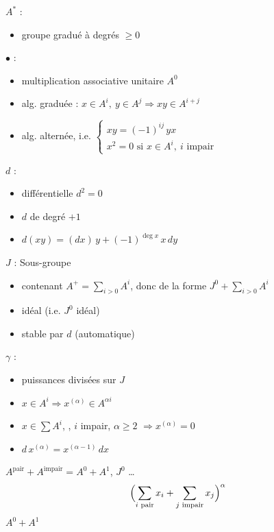 \documentclass[11pt,a4paper]{article}
\begin{document}
$A^*$ :
\begin{itemize}
  \item[($*$)] groupe gradué à degrés $\geq 0$
\end{itemize}
$\bullet$ :
\begin{itemize}
  \item[($*$)] multiplication associative unitaire \struck{\ill{}}  $A^0$
  \item[($*$)] alg. graduée : $x \in A^i,\ y \in A^j \Rightarrow xy \in A^{i+j}$
  \item[] alg. alternée, i.e.
    $\left\{\begin{array}{l} xy = (-1)^{ij}\, yx \\ x^2 = 0 \text{ si } x \in A^i,\ i \text{ impair} \end{array}\right.$
\end{itemize}
$d$ :
\begin{itemize}
  \item[($*$)] différentielle $d^2 = 0$
  \item[($*$)] $d$ de degré $+1$
  \item[($*$)] $d(xy) = (dx)\,y + (-1)^{\deg x}\, x\, dy$
\end{itemize}
$J$ : Sous-groupe
\begin{itemize}
  \item[($*$)] contenant $A^+ = \sum_{i>0} A^i$, donc  de la forme $J^0 + \sum_{i>0} A^i$
  \item[($*$)] idéal (i.e. $J^0$ idéal)
  \item[($*$)] stable par $d$ (automatique)
\end{itemize}
$\gamma$ :
\begin{itemize}
  \item[($*$)] puissances divisées sur $J$ 
  \item[($*$)] $x \in A^i \Longrightarrow x^{(\alpha)} \in A^{\alpha i}$
  \item[($*$)]  $x \in \sum A^i$, , $i$ impair, $\alpha \geq 2$ $\Longrightarrow x^{(\alpha)} = 0$
  \item[($*$)] $d\,x^{(\alpha)} = x^{(\alpha-1)}\, dx$
\end{itemize}


$A^{\mathrm{pair}} + A^{\mathrm{impair}} = A^0 + A^1$, \quad $J^0$ …
\[
  \Bigl(\sum_{i \text{ pair}} x_i + \sum_{j \text{ impair}} x_j\Bigr)^{\alpha}
\]
$A^0 + A^1$
 \quad
{}
\end{document}

